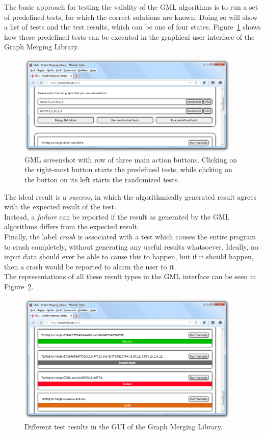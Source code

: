 \documentclass[a4paper,12pt,twoside,BCOR=10mm]{scrbook}
\begin{document}
The basic approach for testing the validity of the GML algorithms is to run a set
of predefined tests, for which the correct solutions are known. Doing so will
show a list of tests and the test results, which can be one of four states.
Figure~\ref{fig:evo_gml_test_buttons} shows how these predefined tests can be executed in the graphical user interface
of the Graph Merging Library. \\
\begin{figure}[!htb]
\centering
\includegraphics[width=0.95\textwidth]{evo_gml_test_buttons.png}
\caption[GML Test Execution]{GML screenshot with row of three main action buttons. Clicking on the right-most button starts the predefined tests, while clicking on the button on its left starts the randomized tests.} \label{fig:evo_gml_test_buttons}
\end{figure}
The ideal result is a \textit{success}, in which the algorithmically generated result agrees with the
expected result of the test. \\
Instead, a \textit{failure} can be reported if the result as generated by the GML algorithms
differs from the expected result. \\
Finally, the label \textit{crash} is associated with a test which causes the
entire program to crash completely, without generating any useful results whatsoever.
Ideally, no input data should ever be able to cause this to happen,
but if it should happen, then a crash would be reported to alarm the user to it. \\
The representations of all these result types in the GML interface can be seen in Figure~\ref{fig:evo_gml_different_test_results}.
\begin{figure}[!htb]
\centering
\includegraphics[width=0.95\textwidth]{evo_gml_different_test_results.png}
\caption[GML Test Results]{Different test results in the GUI of the Graph Merging Library.} \label{fig:evo_gml_different_test_results}
\end{figure}
\end{document}
